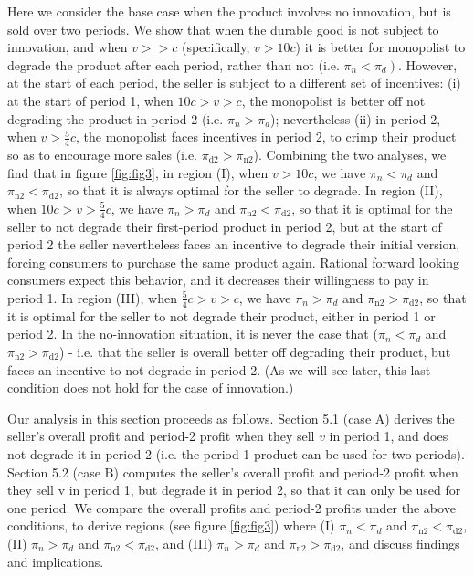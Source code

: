 \documentclass[isre,blindrev]{informs3} %
\begin{document}
Here we consider the base case when the product involves no innovation, but is sold over two periods. We show that when the durable good is not subject
to innovation, and when \(v>>c\) (specifically, \(v>10c\)) it is better for monopolist to degrade the product after each period, rather than not
(i.e. \(\left.\pi _n<\pi _d\right)\). However, at the start of each period, the seller is subject to a different set of incentives: { }(i) at the
start of period 1, when \(10c>v>c\), the monopolist is better off not degrading the product in period 2 (i.e. \(\pi _n>\pi _d\)); nevertheless (ii)
in period 2, when \(v>\frac{5}{4}c\), the monopolist faces incentives in period 2, to crimp their product so as to encourage more sales (i.e. \(\pi
_{\text{d2}}>\pi _{\text{n2}}\)). Combining the two analyses, we find that in figure \ref{fig:fig3}, in region (I), when \(v>10c\), we have \(\pi _n<\pi _d\)
and \(\pi _{\text{n2}}<\pi _{\text{d2}}\), so that it is always optimal for the seller to degrade. In region (II), when \(10c>v>\frac{5}{4}c\), we
have \(\pi _n>\pi _d\) and \(\pi _{\text{n2}}<\pi _{\text{d2}}\), so that it is optimal for the seller to not degrade their first-period product
in period 2, but at the start of period 2 the seller nevertheless faces an incentive to degrade their initial version, forcing consumers to purchase
the same product again. Rational forward looking consumers expect this behavior, and it decreases their willingness to pay in period 1. In region
(III), when \(\frac{5}{4}c>v>c\), { }we have \(\pi _n>\pi _d\) and \(\pi _{\text{n2}}>\pi _{\text{d2}}\), so that it is optimal for the seller to
not degrade their product, either in period 1 or period 2. In the no-innovation situation, it is never the case that (\(\pi _n<\pi _d\) and \(\pi
_{\text{n2}}>\pi _{\text{d2}}\)) - i.e. that the seller is overall better off degrading their product, but faces an incentive to not degrade in period
2. (As we will see later, this last condition does not hold for the case of innovation.)

Our analysis in this section proceeds as follows. Section 5.1 (case A) derives the seller{'}s overall profit and period-2 profit when they sell \(v\)
in period 1, and does not degrade it in period 2 (i.e. the period 1 product can be used for two periods). Section 5.2 (case B) computes the seller{'}s
overall profit and period-2 profit when they sell v in period 1, but degrade it in period 2, so that it can only be used for one period. We compare
the overall profits and period-2 profits under the above conditions, to derive regions (see figure \ref{fig:fig3}) where (I) \(\pi _n<\pi _d\) and \(\pi
_{\text{n2}}<\pi _{\text{d2}}\), (II) \(\pi _n>\pi _d\) and \(\pi _{\text{n2}}<\pi _{\text{d2}}\), and (III) \(\pi _n>\pi _d\) and \(\pi _{\text{n2}}>\pi
_{\text{d2}}\), and discuss findings and implications.
\end{document}
